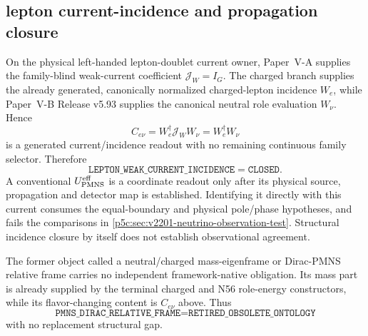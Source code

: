 \documentclass[12pt,a4paper]{article}
\begin{document}
\subsection{lepton current-incidence and propagation closure}
\label{p7v2:sec:v267-lepton-current-incidence-closure}

\begin{theorem}
\label{p7v2:thm:v267-generated-lepton-current-incidence}
On the physical left-handed lepton-doublet current owner, Paper~V-A supplies
the family-blind weak-current coefficient $\mathscr J_W=I_G$.  The charged
branch supplies the already generated, canonically normalized charged-lepton
incidence $W_e$, while Paper~V-B Release v5.93 supplies the canonical neutral
role evaluation $W_\nu$.  Hence
\[
 \boxed{C_{e\nu}=W_e^\dagger\mathscr J_WW_\nu=W_e^\dagger W_\nu}
\]
is a generated current/incidence readout with no remaining continuous family
selector.  Therefore
\[
 \boxed{
 \texttt{LEPTON\_WEAK\_CURRENT\_INCIDENCE}=\texttt{CLOSED}.}
\]
A conventional $U_{\rm PMNS}^{\rm eff}$ is a coordinate readout only
after its physical source, propagation and detector map is established.
Identifying it directly with this current consumes the equal-boundary
and physical pole/phase hypotheses, and fails the comparisons in
\ref{p5c:sec:v2201-neutrino-observation-test}. Structural incidence
closure by itself does not establish observational agreement.
\end{theorem}

\begin{corollary}
\label{p7v2:cor:v267-former-pmns-target-exhausted}
The former object called a neutral/charged mass-eigenframe or Dirac-PMNS
relative frame carries no independent framework-native obligation.  Its mass
part is already supplied by the terminal charged and N56 role-energy
constructors, while its flavor-changing content is $C_{e\nu}$ above.  Thus
\[
 \boxed{
 \texttt{PMNS\_DIRAC\_RELATIVE\_FRAME}
 =\texttt{RETIRED\_OBSOLETE\_ONTOLOGY}}
\]
with no replacement structural gap.
\end{corollary}
\end{document}
